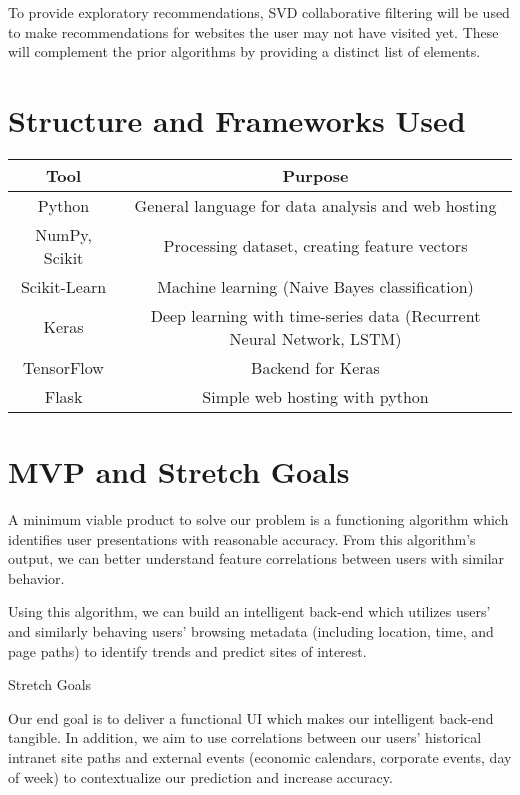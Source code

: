 \documentclass{article}
\begin{document}
To provide exploratory recommendations, SVD collaborative filtering will be used to 
make recommendations for websites the user may not have visited yet. These 
will complement the prior algorithms by providing a distinct list of elements. \\

\section*{Structure and Frameworks Used}
\begin{center}
 \begin{tabular}{|c | c |} 
 \hline
 Tool & Purpose \\ [0.5ex] 
 \hline\hline
 Python & General language for data analysis and web hosting\\ 
 \hline
 NumPy, Scikit & Processing dataset, creating feature vectors\\ 
 \hline
 Scikit-Learn & Machine learning (Naive Bayes classification) \\ 
 \hline
 Keras & Deep learning with time-series data (Recurrent Neural Network, LSTM) \\ 
 \hline
 TensorFlow & Backend for Keras \\ 
 \hline
 Flask & Simple web hosting with python \\ 
 \hline
\end{tabular}
\end{center} 

\section*{MVP and Stretch Goals}
A minimum viable product to solve our problem is a functioning algorithm which identifies user presentations with reasonable accuracy. From this algorithm's output, we can better understand feature correlations between users with similar behavior.

Using this algorithm, we can build an intelligent back-end which utilizes users' and similarly behaving users' browsing metadata (including location, time, and page paths) to identify trends and predict sites of interest.

Stretch Goals

Our end goal is to deliver a functional UI which makes our intelligent back-end tangible. In addition, we aim to use correlations between our users' historical intranet site paths and external events (economic calendars, corporate events, day of week) to contextualize our prediction and increase accuracy.
\end{document}
